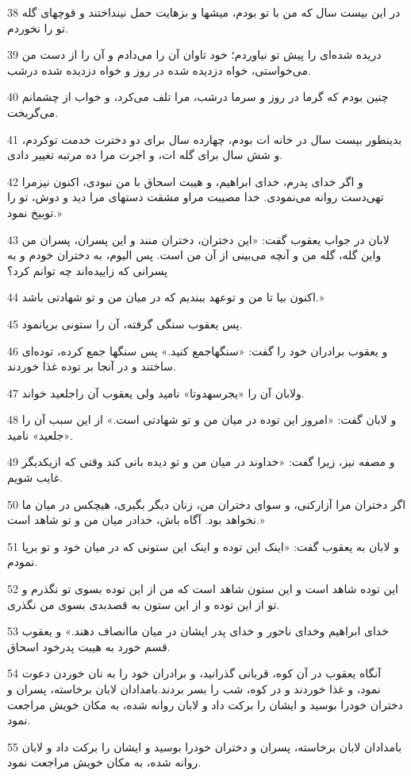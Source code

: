 \par 38 در این بیست سال که من با تو بودم، میشها و بزهایت حمل نینداختند و قوچهای گله تو را نخوردم.
\par 39 دریده شده‌ای را پیش تو نیاوردم؛ خود تاوان آن را می‌دادم و آن را از دست من می‌خواستی، خواه دزدیده شده در روز و خواه دزدیده شده درشب.
\par 40 چنین بودم که گرما در روز و سرما درشب، مرا تلف می‌کرد، و خواب از چشمانم می‌گریخت.
\par 41 بدینطور بیست سال در خانه ات بودم، چهارده سال برای دو دخترت خدمت توکردم، و شش سال برای گله ات، و اجرت مرا ده مرتبه تغییر دادی.
\par 42 و اگر خدای پدرم، خدای ابراهیم، و هیبت اسحاق با من نبودی، اکنون نیزمرا تهی‌دست روانه می‌نمودی. خدا مصیبت مراو مشقت دستهای مرا دید و دوش، تو را توبیخ نمود.»
\par 43 لابان در جواب یعقوب گفت: «این دختران، دختران منند و این پسران، پسران من واین گله، گله من و آنچه می‌بینی از آن من است. پس الیوم، به دختران خودم و به پسرانی که زاییده‌اند چه توانم کرد؟
\par 44 اکنون بیا تا من و توعهد ببندیم که در میان من و تو شهادتی باشد.»
\par 45 پس یعقوب سنگی گرفته، آن را ستونی برپانمود.
\par 46 و یعقوب برادران خود را گفت: «سنگهاجمع کنید.» پس سنگها جمع کرده، توده‌ای ساختند و در آنجا بر توده غذا خوردند.
\par 47 ولابان آن را «یجرسهدوتا» نامید ولی یعقوب آن راجلعید خواند.
\par 48 و لابان گفت: «امروز این توده در میان من و تو شهادتی است.» از این سبب آن را «جلعید» نامید.
\par 49 و مصفه نیز، زیرا گفت: «خداوند در میان من و تو دیده بانی کند وقتی که ازیکدیگر غایب شویم.
\par 50 اگر دختران مرا آزارکنی، و سوای دختران من، زنان دیگر بگیری، هیچکس در میان ما نخواهد بود. آگاه باش، خدادر میان من و تو شاهد است.»
\par 51 و لابان به یعقوب گفت: «اینک این توده و اینک این ستونی که در میان خود و تو برپا نمودم.
\par 52 این توده شاهد است و این ستون شاهد است که من از این توده بسوی تو نگذرم و تو از این توده و از این ستون به قصدبدی بسوی من نگذری.
\par 53 خدای ابراهیم وخدای ناحور و خدای پدر ایشان در میان ماانصاف دهند.» و یعقوب قسم خورد به هیبت پدرخود اسحاق.
\par 54 آنگاه یعقوب در آن کوه، قربانی گذرانید، و برادران خود را به نان خوردن دعوت نمود، و غذا خوردند و در کوه، شب را بسر بردند.بامدادان لابان برخاسته، پسران و دختران خودرا بوسید و ایشان را برکت داد و لابان روانه شده، به مکان خویش مراجعت نمود.
\par 55 بامدادان لابان برخاسته، پسران و دختران خودرا بوسید و ایشان را برکت داد و لابان روانه شده، به مکان خویش مراجعت نمود.
 
